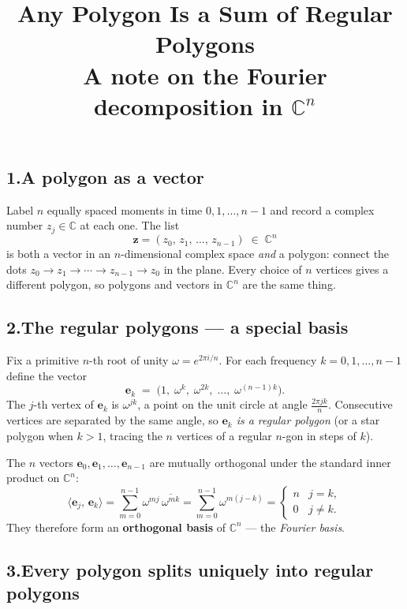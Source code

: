 \documentclass[11pt]{article}
\title{\textbf{Any Polygon Is a Sum of Regular Polygons}\\[4pt]
       \large A note on the Fourier decomposition in $\mathbb{C}^n$}
\author{}
\date{}
\begin{document}
\maketitle
\thispagestyle{empty}
\vspace{-1em}

\subsection*{1.\enspace A polygon as a vector}

Label $n$ equally spaced moments in time $0, 1, \ldots, n{-}1$ and record a
complex number $z_j \in \mathbb{C}$ at each one.
The list
\[
  \mathbf{z} = (z_0,\, z_1,\, \ldots,\, z_{n-1}) \;\in\; \mathbb{C}^n
\]
is both a vector in an $n$-dimensional complex space \emph{and} a polygon:
connect the dots $z_0 \to z_1 \to \cdots \to z_{n-1} \to z_0$ in the plane.
Every choice of $n$ vertices gives a different polygon, so polygons and
vectors in $\mathbb{C}^n$ are the same thing.

\subsection*{2.\enspace The regular polygons — a special basis}

Fix a primitive $n$-th root of unity $\omega = e^{2\pi i/n}$.
For each frequency $k = 0, 1, \ldots, n{-}1$ define the vector
\[
  \mathbf{e}_k
  \;=\;
  \bigl(1,\; \omega^k,\; \omega^{2k},\; \ldots,\; \omega^{(n-1)k}\bigr).
\]
The $j$-th vertex of $\mathbf{e}_k$ is $\omega^{jk}$, a point on the unit
circle at angle $\tfrac{2\pi jk}{n}$.
Consecutive vertices are separated by the same angle, so \emph{$\mathbf{e}_k$
is a regular polygon} (or a star polygon when $k > 1$, tracing the $n$
vertices of a regular $n$-gon in steps of $k$).

The $n$ vectors $\mathbf{e}_0, \mathbf{e}_1, \ldots, \mathbf{e}_{n-1}$ are
mutually orthogonal under the standard inner product on $\mathbb{C}^n$:
\[
  \langle \mathbf{e}_j,\, \mathbf{e}_k \rangle
  = \sum_{m=0}^{n-1} \omega^{mj}\,\overline{\omega^{mk}}
  = \sum_{m=0}^{n-1} \omega^{m(j-k)}
  = \begin{cases} n & j = k, \\ 0 & j \neq k. \end{cases}
\]
They therefore form an \textbf{orthogonal basis} of $\mathbb{C}^n$ —
the \emph{Fourier basis}.

\subsection*{3.\enspace Every polygon splits uniquely into regular polygons}
\end{document}
